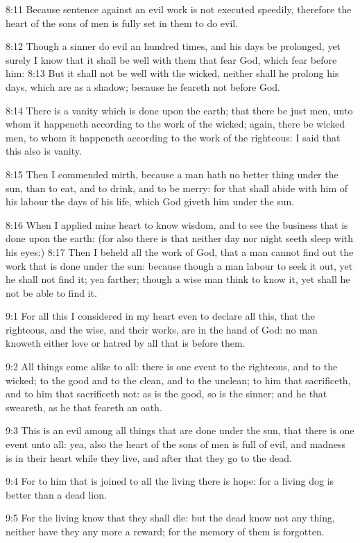 8:11 Because sentence against an evil work is not executed speedily,
therefore the heart of the sons of men is fully set in them to do
evil.

8:12 Though a sinner do evil an hundred times, and his days be
prolonged, yet surely I know that it shall be well with them that fear
God, which fear before him: 8:13 But it shall not be well with the
wicked, neither shall he prolong his days, which are as a shadow;
because he feareth not before God.

8:14 There is a vanity which is done upon the earth; that there be
just men, unto whom it happeneth according to the work of the wicked;
again, there be wicked men, to whom it happeneth according to the work
of the righteous: I said that this also is vanity.

8:15 Then I commended mirth, because a man hath no better thing under
the sun, than to eat, and to drink, and to be merry: for that shall
abide with him of his labour the days of his life, which God giveth
him under the sun.

8:16 When I applied mine heart to know wisdom, and to see the business
that is done upon the earth: (for also there is that neither day nor
night seeth sleep with his eyes:) 8:17 Then I beheld all the work of
God, that a man cannot find out the work that is done under the sun:
because though a man labour to seek it out, yet he shall not find it;
yea farther; though a wise man think to know it, yet shall he not be
able to find it.

9:1 For all this I considered in my heart even to declare all this,
that the righteous, and the wise, and their works, are in the hand of
God: no man knoweth either love or hatred by all that is before them.

9:2 All things come alike to all: there is one event to the righteous,
and to the wicked; to the good and to the clean, and to the unclean;
to him that sacrificeth, and to him that sacrificeth not: as is the
good, so is the sinner; and he that sweareth, as he that feareth an
oath.

9:3 This is an evil among all things that are done under the sun, that
there is one event unto all: yea, also the heart of the sons of men is
full of evil, and madness is in their heart while they live, and after
that they go to the dead.

9:4 For to him that is joined to all the living there is hope: for a
living dog is better than a dead lion.

9:5 For the living know that they shall die: but the dead know not any
thing, neither have they any more a reward; for the memory of them is
forgotten.

